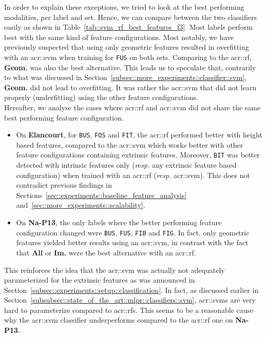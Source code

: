         In order to explain these exceptions, we tried to look at the best performing modalities, per label and set.
        Hence, we can compare between the two classifiers easily as shown in Table~\ref{tab::svm_rf_best_features_f3}.
        Most labels perform best with the same kind of feature configurations.
        Most notably, we have previously suspected that using only geometric features resulted in overfitting with an \gls{acr::svm} when training for \texttt{FUS} on both sets.
        Comparing to the \gls{acr::rf}, \textbf{Geom.} was also the best alternative.
        This leads us to speculate that, contrarily to what was discussed in Section~\ref{subsec::more_experiments::classifier::svm}, \textbf{Geom.} did not lead to overfitting.
        It was rather the \gls{acr::svm} that did not learn properly (underfitting) using the other feature configurations.\\

        Hereafter, we analyse the cases where \gls{acr::rf} and \gls{acr::svm} did not share the same best performing feature configuration.
        \begin{itemize}[label=\(\blacktriangleright\)]
            \item On \textbf{Elancourt}, for \texttt{BUS}, \texttt{FOS} and \texttt{FIT}, the \gls{acr::rf} performed better with height based features, compared to the \gls{acr::svm} which works better with other feature configurations containing extrinsic features.
                    Moreover, \texttt{BIT} was better detected with intrinsic features only (\textit{resp.} any extrinsic feature based configuration) when trained with an \gls{acr::rf} (\textit{resp.} \gls{acr::svm}).
                    This does not contradict previous findings in Sections~\ref{sec::experiments::baseline_feature_analysis} and~\ref{sec::more_experiments::scalability}.
            \item On \textbf{Na-P13}, the only labels where the better performing feature configuration changed were \texttt{BUS}, \texttt{FUS}, \texttt{FIB} and \texttt{FIG}.
                    In fact, only geometric features yielded better results using an \gls{acr::svm}, in contrast with the fact that \textbf{All} or \textbf{Im.} were the best alternative with an \gls{acr::rf}.
        \end{itemize}
        This reinforces the idea that the \gls{acr::svm} was actually not adequately parameterized for the extrinsic features as was announced in Section~\ref{subsec::experiments::setup::classification}.
        In fact, as discussed earlier in Section~\ref{subsubsec::state_of_the_art::mlpr::classifiers::svm}, \glspl{acr::svm} are very hard to parameterize compared to \glspl{acr::rf}.
        This seems to be a reasonable cause why the \gls{acr::svm} classifier underperforms compared to the \gls{acr::rf} one on \textbf{Na-P13}.

